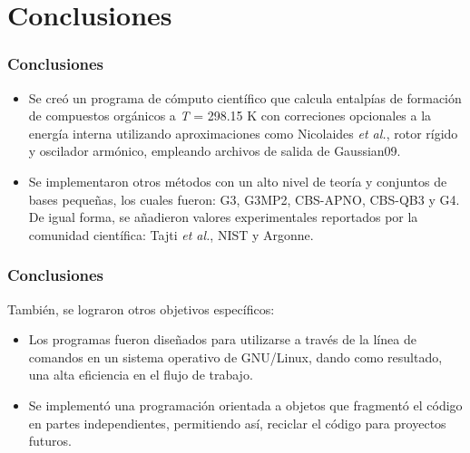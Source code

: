 \documentclass{beamer}
\begin{document}
\section{Conclusiones}
\begin{frame}
\frametitle{Conclusiones}

\begin{itemize}

\item Se creó un programa de cómputo científico que calcula entalpías de formación de compuestos orgánicos a \textit{T} = 298.15 K con correciones opcionales a la energía interna utilizando aproximaciones como Nicolaides \textit{et al.}, rotor rígido y oscilador armónico, empleando archivos de salida de Gaussian09.

\vspace{1cm}

\item Se implementaron otros métodos con un alto nivel de teoría y conjuntos de bases pequeñas, los cuales fueron: G3, G3MP2, CBS-APNO, CBS-QB3 y G4. De igual forma, se añadieron valores experimentales reportados por la comunidad científica: Tajti \textit{et al.}, NIST y Argonne.

\end{itemize}
\end{frame}

\begin{frame}
\frametitle{Conclusiones}
También, se lograron otros objetivos específicos:
\vspace{1cm}

\begin{itemize}
\item Los programas fueron diseñados para utilizarse a través de la línea de comandos en un sistema operativo de GNU/Linux, dando como resultado, una alta eficiencia en el flujo de trabajo.

\item Se implementó una programación orientada a objetos que fragmentó el código en partes independientes, permitiendo así, reciclar el código para proyectos futuros.
\end{itemize}
\end{frame}
\end{document}
